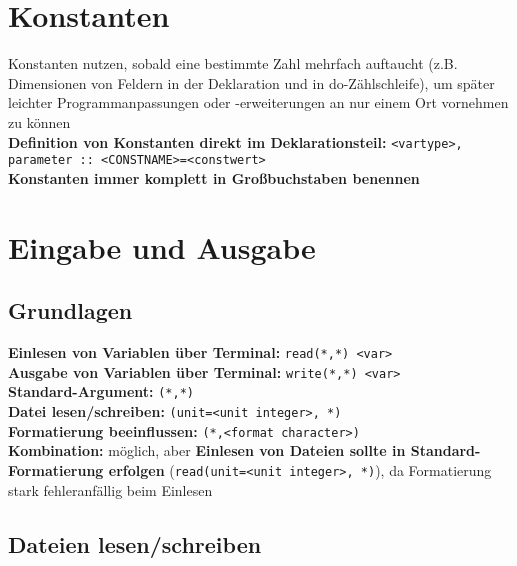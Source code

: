 \documentclass[a4paper, twocolumn]{scrarticle}
\begin{document}
  \section{Konstanten}
  Konstanten nutzen, sobald eine bestimmte Zahl mehrfach auftaucht (z.B. Dimensionen von Feldern in der Deklaration und in do-Zählschleife), um später leichter Programmanpassungen oder -erweiterungen an nur einem Ort vornehmen zu können\\
  \textbf{Definition von Konstanten direkt im Deklarationsteil:} \lstinline|<vartype>, parameter :: <CONSTNAME>=<constwert>| \\
 \textbf{Konstanten immer komplett in Großbuchstaben benennen}
 \section{Eingabe und Ausgabe}
 \subsection{Grundlagen}
 \textbf{Einlesen von Variablen über Terminal:} \lstinline|read(*,*) <var>|\\
 \textbf{Ausgabe von Variablen über Terminal:} \lstinline|write(*,*) <var>|\\
 \textbf{Standard-Argument:} \lstinline|(*,*)|\\
 \textbf{Datei lesen/schreiben:} \lstinline|(unit=<unit integer>, *)|\\
 \textbf{Formatierung beeinflussen:} \lstinline|(*,<format character>)|\\
 \textbf{Kombination:} möglich, aber \textbf{Einlesen von Dateien sollte in Standard-Formatierung erfolgen} (\lstinline|read(unit=<unit integer>, *)|), da Formatierung stark fehleranfällig beim Einlesen
 
 \subsection{Dateien lesen/schreiben}
\end{document}
